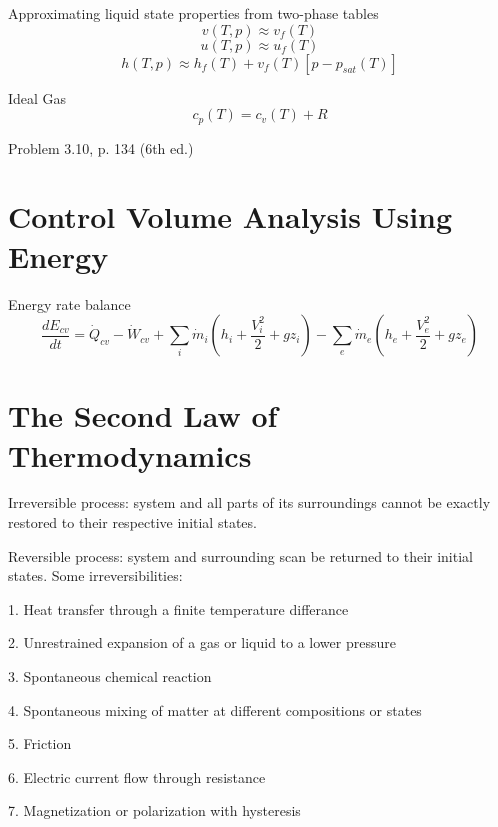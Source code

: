 \documentclass[paper=letter, fontsize=11pt]{scrartcl}
\numberwithin{equation}{section}        %
\numberwithin{figure}{section}          %
\numberwithin{table}{section}               %
\begin{document}
Approximating liquid state properties from two-phase tables
\begin{equation}
    v(T,p)\approx v_f(T)
\end{equation}
\begin{equation}
    u(T,p)\approx u_f(T)
\end{equation}
\begin{equation}
    h(T,p)\approx h_f(T) + v_f(T)[p-p_{sat}(T)]
\end{equation}

Ideal Gas
\begin{equation}
    c_p(T) = c_v(T)+R
\end{equation}

Problem 3.10, p. 134 (6th ed.)

\section{Control Volume Analysis Using Energy}

Energy rate balance
\begin{equation}
    \frac{dE_{cv}}{dt} = \dot Q_{cv} -  \dot W_{cv} + \sum_i \dot m_i \left(h_i + \frac{V_i^2}{2} + gz_i \right) - \sum_e \dot m_e \left(h_e + \frac{V_e^2}{2} + gz_e \right) 
\end{equation}

\section{The Second Law of Thermodynamics}

Irreversible process: system and all parts of its surroundings cannot be exactly restored to their respective initial states.

Reversible process: system and surrounding scan be returned to their initial states.
\newline
\newline
Some irreversibilities:

1. Heat transfer through a finite temperature differance

2. Unrestrained expansion of a gas or liquid to a lower pressure

3. Spontaneous chemical reaction

4. Spontaneous mixing of matter at different compositions or states

5. Friction

6. Electric current flow through resistance

7. Magnetization or polarization with hysteresis
\end{document}
